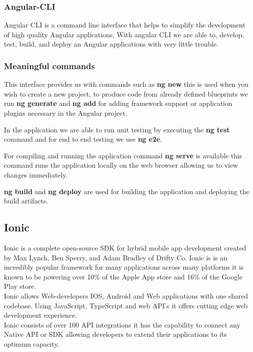 \documentclass[a4paper,12pt,twoside]{report}
\begin{document}
\subsubsection{Angular-CLI}
Angular CLI is a  command line interface that helps to simplify the development of high quality Angular applications. 
With angular CLI we are able to, develop, test, build, and deploy an Angular applications with very little trouble.

\subsubsection{Meaningful commands}

This interface provides us with commands such as \textbf{ng new} this is used when you wish to create a new project, to produce code from already defined blueprints we run \textbf{ng generate} and \textbf{ng add} for adding framework support or application plugins necessary in the Angular project.

In the application we are able to run unit testing by executing the \textbf{ng test} command and for end to end testing we use \textbf{ng e2e}.

For compiling and running the application command \textbf{ng serve} is available this command runs the application locally on the web browser allowing us to view changes immediately.

\textbf{ng build} and \textbf{ng deploy} are used for building the application and deploying the build artifacts.\cite{angularGuide} 

\subsection{Ionic}

Ionic is a complete open-source SDK for hybrid mobile app development created by Max Lynch, Ben Sperry, and Adam Bradley of Drifty Co.
Ionic is is an incredibly popular framework for many applications across many platforms it is known to be powering over 10\% of the Apple App store and 16\% of the Google Play store.\\
Ionic allows Web-developers IOS, Android and Web applications with one shared codebase. Using JavaScript, TypeScript and web API's it offers cutting edge web development experience.\\
Ionic consists of over 100 API integrations it has the capability to connect any Native API or SDK allowing developers to extend their applications to its optimum capacity.\cite{ionicInsight}\\
\end{document}
